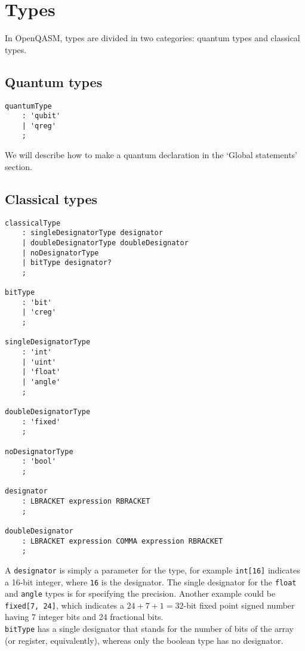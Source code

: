 \documentclass[12pt,a4paper]{report}
\theoremstyle{definition}
\theoremstyle{definition}
\theoremstyle{definition}
\begin{document}
\section{Types}
In OpenQASM, types are divided in two categories: quantum types and classical types.
\subsection{Quantum types}
\begin{lstlisting}
quantumType
    : 'qubit'
    | 'qreg'
    ;
\end{lstlisting}
We will describe how to make a quantum declaration in the `Global statements' section.

\subsection{Classical types}
\begin{lstlisting}
classicalType
    : singleDesignatorType designator
    | doubleDesignatorType doubleDesignator
    | noDesignatorType
    | bitType designator?
    ;

bitType
    : 'bit'
    | 'creg'
    ;

singleDesignatorType
    : 'int'
    | 'uint'
    | 'float'
    | 'angle'
    ;

doubleDesignatorType
    : 'fixed'
    ;

noDesignatorType
    : 'bool'
    ;

designator
    : LBRACKET expression RBRACKET
    ;

doubleDesignator
    : LBRACKET expression COMMA expression RBRACKET
    ;
\end{lstlisting}
A \texttt{designator} is simply a parameter for the type, for example \texttt{int[16]} indicates a 16-bit integer, where \texttt{16} is the designator. The single designator for the \texttt{float} and \texttt{angle} types is for specifying the precision. Another example could be \texttt{fixed[7, 24]}, which indicates a $24+7+1=32$-bit fixed point signed number having 7 integer bits and 24 fractional bits.\\
\texttt{bitType} has a single designator that stands for the number of bits of the  array (or register, equivalently), whereas only the boolean type has no designator.\\
\end{document}
